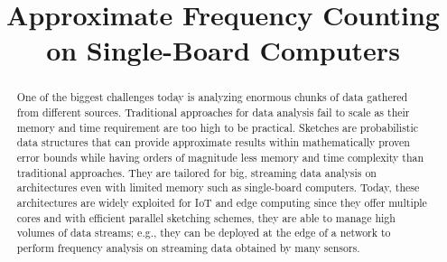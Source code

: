 \documentclass[10pt, review=true,sigconf]{acmart}
\begin{document}
	\title{Approximate Frequency Counting on Single-Board Computers}


%
%

    \begin{abstract}

One of the biggest challenges today is analyzing enormous chunks of data gathered from different sources. Traditional approaches for data analysis fail to scale as their memory and time requirement are too high to be practical.
Sketches are probabilistic data structures that can provide approximate results within mathematically proven error bounds while having orders of magnitude less memory and time complexity than traditional approaches. They are tailored for big, streaming data analysis on architectures even with limited memory such as single-board computers. Today, these architectures are widely exploited for IoT and edge computing since they offer multiple cores and with efficient parallel sketching schemes, they are able to manage high volumes of data streams; e.g., they can be deployed at the edge of a network to perform frequency analysis on streaming data obtained by many sensors. 


\end{abstract}
\end{document}
